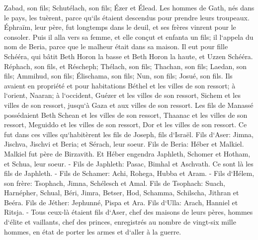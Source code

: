 \verse Zabad, son fils; Schutélach, son fils; Ézer et Élead. Les hommes de Gath, nés dans le pays, les tuèrent, parce qu`ils étaient descendus pour prendre leurs troupeaux. 
\verse Éphraïm, leur père, fut longtemps dans le deuil, et ses frères vinrent pour le consoler. 
\verse Puis il alla vers sa femme, et elle conçut et enfanta un fils; il l`appela du nom de Beria, parce que le malheur était dans sa maison. 
\verse Il eut pour fille Schééra, qui bâtit Beth Horon la basse et Beth Horon la haute, et Uzzen Schééra. 
\verse Réphach, son fils, et Réscheph; Thélach, son fils; Thachan, son fils; 
\verse Laedan, son fils; Ammihud, son fils; Élischama, son fils; 
\verse Nun, son fils; Josué, son fils. 
\verse Ils avaient en propriété et pour habitations Béthel et les villes de son ressort; à l`orient, Naaran; à l`occident, Guézer et les villes de son ressort, Sichem et les villes de son ressort, jusqu`à Gaza et aux villes de son ressort. 
\verse Les fils de Manassé possédaient Beth Schean et les villes de son ressort, Thaanac et les villes de son ressort, Meguiddo et les villes de son ressort, Dor et les villes de son ressort. Ce fut dans ces villes qu`habitèrent les fils de Joseph, fils d`Israël. 
\verse Fils d`Aser: Jimna, Jischva, Jischvi et Beria; et Sérach, leur soeur. 
\verse Fils de Beria: Héber et Malkiel. Malkiel fut père de Birzavith. 
\verse Et Héber engendra Japhleth, Schomer et Hotham, et Schua, leur soeur. - 
\verse Fils de Japhleth: Pasac, Bimhal et Aschvath. Ce sont là les fils de Japhleth. - 
\verse Fils de Schamer: Achi, Rohega, Hubba et Aram. - 
\verse Fils d`Hélem, son frère: Tsophach, Jimna, Schélesch et Amal. 
\verse Fils de Tsophach: Suach, Harnépher, Schual, Béri, Jimra, 
\verse Betser, Hod, Schamma, Schilscha, Jithran et Beéra. 
\verse Fils de Jéther: Jephunné, Pispa et Ara. 
\verse Fils d`Ulla: Arach, Hanniel et Ritsja. - 
\verse Tous ceux-là étaient fils d`Aser, chef des maisons de leurs pères, hommes d`élite et vaillants, chef des princes, enregistrés au nombre de vingt-six mille hommes, en état de porter les armes et d`aller à la guerre. 

